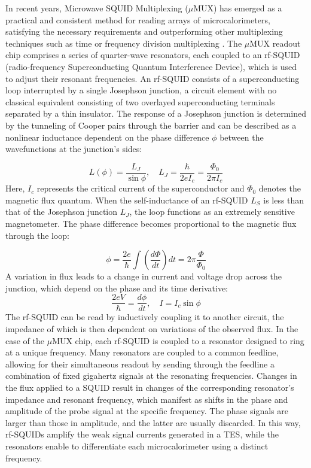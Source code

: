 In recent years, Microwave SQUID Multiplexing ($\mu$MUX) has emerged as a practical and consistent method for reading arrays
of microcalorimeters, satisfying the necessary requirements and outperforming other multiplexing techniques such as time
or frequency division multiplexing \cite{muMUX}.
The $\mu$MUX readout chip comprises a series of quarter-wave resonators, each coupled to an rf-SQUID (radio-frequency
Superconducting Quantum Interference Device), which is used to adjust their resonant frequencies. An rf-SQUID consists
of a superconducting loop interrupted by a single Josephson junction, a circuit element with no classical
equivalent consisting of two overlayed superconducting terminals separated by a thin insulator. The
response of a Josephson junction is determined by the tunneling of Cooper pairs through the barrier and can be described
as a nonlinear inductance dependent on the phase difference $\phi$ between the wavefunctions at the junction's sides:

\begin{equation}
L(\phi) = \frac{L_J}{\sin\phi}, \quad L_J= \frac{\hbar}{2eI_c}= \frac{\Phi_0}{2\pi I_c}
\end{equation}
Here, \(I_c\) represents the critical current of the superconductor and \(\Phi_0\) denotes the magnetic flux quantum.
When the self-inductance of an rf-SQUID \(L_S\) is less than that of the Josephson junction \(L_J\), the loop functions as an extremely sensitive magnetometer. The phase difference becomes proportional to the magnetic flux through the loop:

\begin{equation}
  \phi=\frac{2e}{\hbar}\int\left(\frac{d\Phi}{dt}\right)dt =2\pi\frac{\Phi}{\Phi_{0}}
\end{equation}
A variation in flux leads to a change in current and voltage drop across the junction, which depend on the phase and
its time derivative:
\begin{equation}
  \frac{2e V}{\hbar} = \frac{d\phi}{dt}, \quad I = I_c \sin\phi
  \label{eq:JJ}
\end{equation}
The rf-SQUID can be read by inductively coupling it to another circuit, the impedance of which is then dependent on variations
of the observed flux. In the case of the $\mu$MUX chip, each rf-SQUID is coupled to a resonator designed to
ring at a unique frequency. Many resonators are coupled to a common feedline, allowing for their
simultaneous readout by sending through
the feedline a combination of fixed gigahertz signals at the resonating frequencies. Changes in the flux applied to a SQUID result in changes of the corresponding resonator's impedance and resonant
frequency, which manifest as shifts in the phase and amplitude of the probe signal at the specific frequency.
The phase signals are larger than those in amplitude, and the latter are usually discarded.
In this way, rf-SQUIDs amplify the weak signal currents generated in a TES, while the resonators enable to differentiate each microcalorimeter using a distinct frequency.

